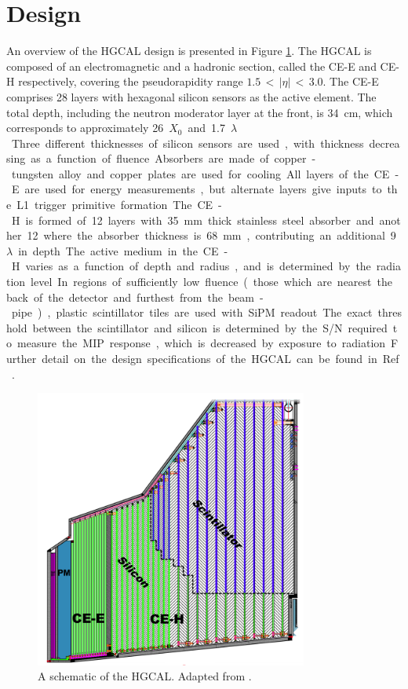 \section{Design}

An overview of the HGCAL design is presented in Figure \ref{fig:hgcal_TheHGCAL}.
The HGCAL is composed of an electromagnetic and a hadronic section, called the CE-E and CE-H respectively, covering the pseudorapidity range $1.5\,<\,|\eta|\,<\,3.0$.
The CE-E comprises 28 layers with hexagonal silicon sensors as the active element.
The total depth, including the neutron moderator layer at the front, is \SI{34}{cm}, which corresponds to approximately \SI{26}{$X_0$} and \SI{1.7}{$\lambda$}.
Three different thicknesses of silicon sensors are used, with thickness decreasing as a function of fluence.
Absorbers are made of copper-tungsten alloy and copper plates are used for cooling.
All layers of the CE-E are used for energy measurements, but alternate layers give inputs to the L1 trigger primitive formation.

The CE-H is formed of 12 layers with \SI{35}{mm} thick stainless steel absorber and another 12 where the absorber thickness is \SI{68}{mm}, contributing an additional \SI{9}{$\lambda$} in depth.
The active medium in the CE-H varies as a function of depth and radius, and is determined by the radiation level.
In regions of sufficiently low fluence (those which are nearest the back of the detector and furthest from the beam-pipe), plastic scintillator tiles are used with SiPM readout.
The exact threshold between the scintillator and silicon is determined by the S/N required to measure the MIP response, which is decreased by exposure to radiation.
Further detail on the design specifications of the HGCAL can be found in Ref.~\cite{HGCAL}.

\begin{figure}[h!]
  \centering
  \includegraphics[width=0.8\textwidth]{Figures/HGCAL/TheHGCAL.png}
  \caption{A schematic of the HGCAL. Adapted from \cite{HGCAL}.}
  \label{fig:hgcal_TheHGCAL}
\end{figure}

